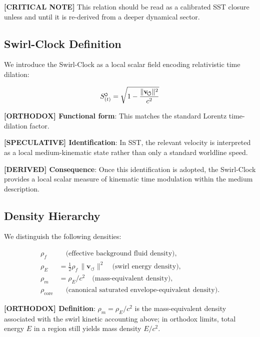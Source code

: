 \documentclass[11pt]{article}
\theoremstyle{definition}
\theoremstyle{plain}
\theoremstyle{remark}
\newcommand{\swirlarrow}{\mathchoice{\mkern-2mu\scriptstyle\boldsymbol{\circlearrowleft}}{\mkern-2mu\scriptstyle\boldsymbol{\circlearrowleft}}{\mkern-2mu\scriptscriptstyle\boldsymbol{\circlearrowleft}}{\mkern-2mu\scriptscriptstyle\boldsymbol{\circlearrowleft}}}
\newcommand{\rhoF}{{\rho_{\!f}}}
\newcommand{\rhoE}{\rho_{\!E}}
\newcommand{\rhoM}{\rho_{\!m}}
\newcommand{\rhocore}{\rho_{\mathrm{core}}}
\newcommand{\SwirlClock}{{S_{(t)}^{\swirlarrow}}}
\newcommand{\vnorm}{\lVert \mathbf{v}_{\!\boldsymbol{\circlearrowleft}} \rVert}
\begin{document}
        \textbf{[CRITICAL NOTE]} This relation should be read as a calibrated SST closure unless and until it is re-derived from a deeper dynamical sector.
    
    \subsection{Swirl-Clock Definition}
        
        We introduce the Swirl-Clock as a local scalar field encoding relativistic time dilation:
        
        \begin{align}
            \SwirlClock = \sqrt{1 - \frac{\vnorm^2}{c^2}}
            \label{eq:swirl_clock}
        \end{align}
        
        \textbf{[ORTHODOX] Functional form}: This matches the standard Lorentz time-dilation factor.

        \textbf{[SPECULATIVE] Identification}: In SST, the relevant velocity is interpreted as a local medium-kinematic state rather than only a standard worldline speed.

        \textbf{[DERIVED] Consequence}: Once this identification is adopted, the Swirl-Clock provides a local scalar measure of kinematic time modulation within the medium description.
    
    \subsection{Density Hierarchy}
        
        We distinguish the following densities:
        
        \begin{align}
            \rhoF &\quad \text{(effective background fluid density)}, \\
            \rhoE &= \tfrac12 \rhoF \, \vnorm^2 \quad \text{(swirl energy density)}, \\
            \rhoM &= \rhoE / c^2 \quad \text{(mass-equivalent density)}, \\
            \rhocore &\quad \text{(canonical saturated envelope-equivalent density)}.
        \end{align}

        \textbf{[ORTHODOX] Definition}: $\rhoM=\rhoE/c^2$ is the mass-equivalent density associated with the swirl kinetic accounting above; in orthodox limits, total energy $E$ in a region still yields mass density $E/c^2$.
\end{document}
